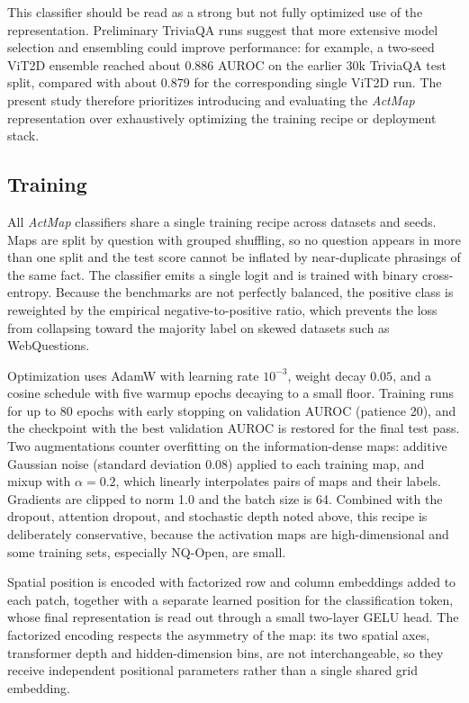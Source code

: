 \documentclass{article}
\newcommand{\actmap}{\textit{ActMap}}
\begin{document}
This classifier should be read as a strong but not fully optimized use of the representation. Preliminary TriviaQA runs suggest that more extensive model selection and ensembling could improve performance: for example, a two-seed ViT2D ensemble reached about 0.886 AUROC on the earlier 30k TriviaQA test split, compared with about 0.879 for the corresponding single ViT2D run. The present study therefore prioritizes introducing and evaluating the \actmap{} representation over exhaustively optimizing the training recipe or deployment stack.

\subsection{Training}

All \actmap{} classifiers share a single training recipe across datasets and seeds. Maps are split by question with grouped shuffling, so no question appears in more than one split and the test score cannot be inflated by near-duplicate phrasings of the same fact. The classifier emits a single logit and is trained with binary cross-entropy. Because the benchmarks are not perfectly balanced, the positive class is reweighted by the empirical negative-to-positive ratio, which prevents the loss from collapsing toward the majority label on skewed datasets such as WebQuestions.

Optimization uses AdamW with learning rate \(10^{-3}\), weight decay \(0.05\), and a cosine schedule with five warmup epochs decaying to a small floor. Training runs for up to 80 epochs with early stopping on validation AUROC (patience 20), and the checkpoint with the best validation AUROC is restored for the final test pass. Two augmentations counter overfitting on the information-dense maps: additive Gaussian noise (standard deviation 0.08) applied to each training map, and mixup with \(\alpha=0.2\), which linearly interpolates pairs of maps and their labels. Gradients are clipped to norm 1.0 and the batch size is 64. Combined with the dropout, attention dropout, and stochastic depth noted above, this recipe is deliberately conservative, because the activation maps are high-dimensional and some training sets, especially NQ-Open, are small.

Spatial position is encoded with factorized row and column embeddings added to each patch, together with a separate learned position for the classification token, whose final representation is read out through a small two-layer GELU head. The factorized encoding respects the asymmetry of the map: its two spatial axes, transformer depth and hidden-dimension bins, are not interchangeable, so they receive independent positional parameters rather than a single shared grid embedding.
\end{document}
